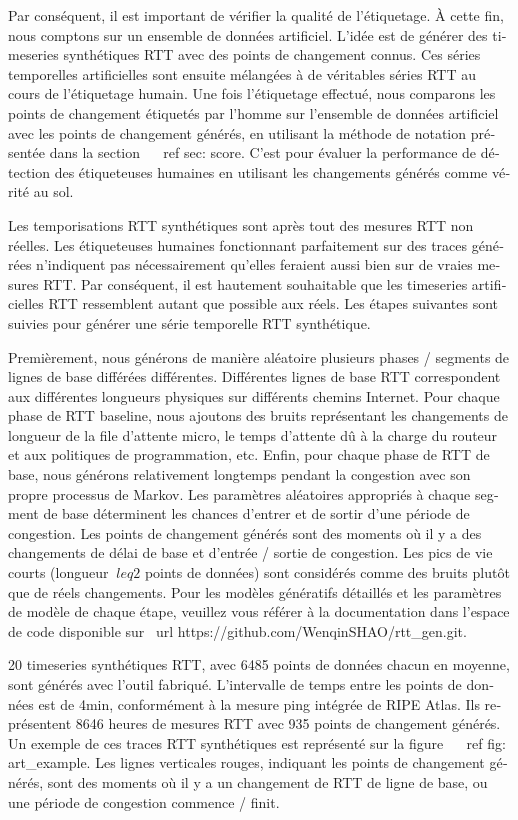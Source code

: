 \begin{otherlanguage}{french}
Par conséquent, il est important de vérifier la qualité de l'étiquetage.
À cette fin, nous comptons sur un ensemble de données artificiel.
L'idée est de générer des timeseries synthétiques RTT avec des points de changement connus.
Ces séries temporelles artificielles sont ensuite mélangées à de véritables séries RTT au cours de l'étiquetage humain.
Une fois l'étiquetage effectué, nous comparons les points de changement étiquetés par l'homme sur l'ensemble de données artificiel avec les points de changement générés, en utilisant la méthode de notation présentée dans la section ~ \ ref {sec: score}.
C'est pour évaluer la performance de détection des étiqueteuses humaines en utilisant les changements générés comme vérité au sol.

Les temporisations RTT synthétiques sont après tout des mesures RTT non réelles.
Les étiqueteuses humaines fonctionnant parfaitement sur des traces générées n'indiquent pas nécessairement qu'elles feraient aussi bien sur de vraies mesures RTT.
Par conséquent, il est hautement souhaitable que les timeseries artificielles RTT ressemblent autant que possible aux réels.
Les étapes suivantes sont suivies pour générer une série temporelle RTT synthétique.

Premièrement, nous générons de manière aléatoire plusieurs phases / segments de lignes de base différées différentes.
Différentes lignes de base RTT correspondent aux différentes longueurs physiques sur différents chemins Internet.
Pour chaque phase de RTT baseline, nous ajoutons des bruits représentant les changements de longueur de la file d'attente micro, le temps d'attente dû à la charge du routeur et aux politiques de programmation, etc.
Enfin, pour chaque phase de RTT de base, nous générons relativement longtemps pendant la congestion avec son propre processus de Markov.
Les paramètres aléatoires appropriés à chaque segment de base déterminent les chances d'entrer et de sortir d'une période de congestion.
Les points de changement générés sont des moments où il y a des changements de délai de base et d'entrée / sortie de congestion.
Les pics de vie courts (longueur $ \ leq 2 $ points de données) sont considérés comme des bruits plutôt que de réels changements.
Pour les modèles génératifs détaillés et les paramètres de modèle de chaque étape, veuillez vous référer à la documentation dans l'espace de code disponible sur \ url {https://github.com/WenqinSHAO/rtt_gen.git}.

20 timeseries synthétiques RTT, avec 6485 points de données chacun en moyenne, sont générés avec l'outil fabriqué.
L'intervalle de temps entre les points de données est de 4min, conformément à la mesure ping intégrée de RIPE Atlas.
Ils représentent 8646 heures de mesures RTT avec 935 points de changement générés.
Un exemple de ces traces RTT synthétiques est représenté sur la figure ~ \ ref {fig: art_example}.
Les lignes verticales rouges, indiquant les points de changement générés, sont des moments où il y a un changement de RTT de ligne de base, ou une période de congestion commence / finit.


\end{otherlanguage}
